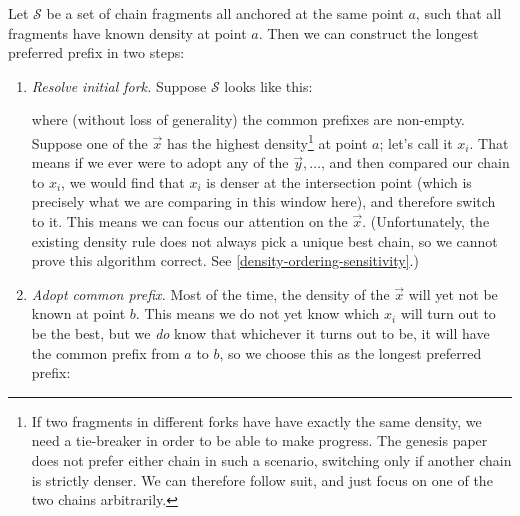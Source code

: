 \begin{definition}
\label{prefix-selection}
Let $\mathcal{S}$ be a set of chain fragments all anchored at the same point $a$,
such that all fragments have known density at point $a$. Then we can construct
the longest preferred prefix in two steps:
%
\begin{enumerate}
\item \emph{Resolve initial fork.}
Suppose $\mathcal{S}$ looks like this:
%
\begin{center}
\end{center}
%
where (without loss of generality) the common prefixes are non-empty. Suppose
one of the $\vec{x}$ has the highest density\footnote{ If two fragments in
different forks have  have exactly the same density, we need a tie-breaker in
order to be able to make progress. The genesis paper does not prefer either
chain in such a scenario, switching only if another chain is strictly denser. We
can therefore follow suit, and just focus on one of the two chains arbitrarily.}
at point $a$; let's call it $x_i$. That means if we ever were to adopt any of
the $\vec{y}, \ldots$, and then compared our chain to $x_i$, we would find that
$x_i$ is denser at the intersection point (which is precisely what we are
comparing in this window here), and therefore switch to it. This means we can
focus our attention on the $\vec{x}$. (Unfortunately, the existing
density rule does not always pick a unique best chain, so we cannot prove this
algorithm correct. See \cref{density-ordering-sensitivity}.)

\item \emph{Adopt common prefix.}
Most of the time, the density of the $\vec{x}$ will yet not be known at point
$b$. This means we do not yet know which $x_i$ will turn out to be the best, but
we \emph{do} know that whichever it turns out to be, it will have the common
prefix from $a$ to $b$, so we choose this as the longest preferred prefix:


\end{enumerate}
\end{definition}
